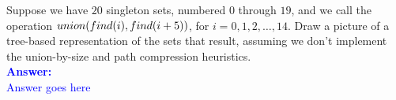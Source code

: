 \item{}
Suppose we have $20$ singleton sets, numbered $0$ through $19$, and we call the
operation ${\sc union}({\sc find}(i),{\sc find}(i+5))$, for $i=0,1,2,\ldots,14$.
Draw a picture of a tree-based representation of the sets that result, assuming
we don't implement the union-by-size and path compression heuristics.\\[12pt]
\ifanswers
\textcolor{blue}{
\textbf{Answer:}\\[6pt]
Answer goes here
}
\newpage
\fi
